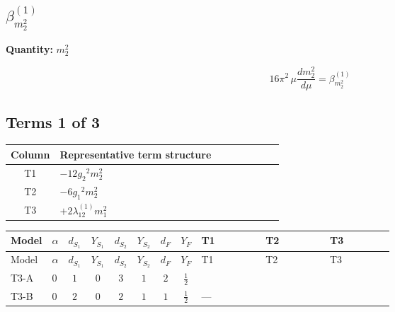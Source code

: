 \documentclass[8pt]{article}
\begin{document}
\begin{landscape}
\section*{$\beta_{m_2^2}^{(1)}$}
\noindent\textbf{Quantity: }$m_2^2$\par\smallskip
\[16\pi^2\,\mu\frac{d m_2^2}{d\mu}=\beta_{m_2^2}^{(1)}\]
\subsection*{Terms 1 of 3}
\begin{center}
\begin{tabular}{@{}c >{\raggedright\arraybackslash}p{0.82\linewidth}@{}}
\toprule
Column & Representative term structure \\
\midrule
T1 & \(\displaystyle -12 {g_2}^2 {m_2^2}\) \\
\midrule
T2 & \(\displaystyle -6 {g_1}^2 {m_2^2}\) \\
\midrule
T3 & \(\displaystyle +2 {\lambda_{12}^{(1)}} {m_1^2}\) \\
\midrule
\bottomrule
\end{tabular}
\end{center}
\smallskip
\tiny
\begin{longtable}{@{}llcccccc >{\raggedright\arraybackslash}p{0.21\linewidth} >{\raggedright\arraybackslash}p{0.21\linewidth} >{\raggedright\arraybackslash}p{0.21\linewidth}@{}}
\toprule
Model & $\alpha$ & $d_{S_1}$ & $Y_{S_1}$ & $d_{S_2}$ & $Y_{S_2}$ & $d_F$ & $Y_F$ & T1 & T2 & T3 \\
\midrule
\endfirsthead
\toprule
Model & $\alpha$ & $d_{S_1}$ & $Y_{S_1}$ & $d_{S_2}$ & $Y_{S_2}$ & $d_F$ & $Y_F$ & T1 & T2 & T3 \\
\midrule
\endhead
T3-A & $0$ & $1$ & $0$ & $3$ & $1$ & $2$ & $\frac{1}{2}$ & \scriptsize\adjustbox{max width=\linewidth}{$\begin{gathered} -12 {g_2}^2 {m_2^2}\end{gathered}$} & \scriptsize\adjustbox{max width=\linewidth}{$\begin{gathered} -6 {g_1}^2 {m_2^2}\end{gathered}$} & \scriptsize\adjustbox{max width=\linewidth}{$\begin{gathered} +2 {\lambda_{12}^{(1)}} {m_1^2}\end{gathered}$} \\
\midrule
T3-B & $0$ & $2$ & $0$ & $2$ & $1$ & $1$ & $\frac{1}{2}$ & --- & \scriptsize\adjustbox{max width=\linewidth}{$\begin{gathered} -6 {g_1}^2 {m_2^2}\end{gathered}$} & \scriptsize\adjustbox{max width=\linewidth}{$\begin{gathered} +4 {\lambda_{12}^{(1)}} {m_1^2}\end{gathered}$} \\

\end{longtable}
\end{landscape}
\end{document}
